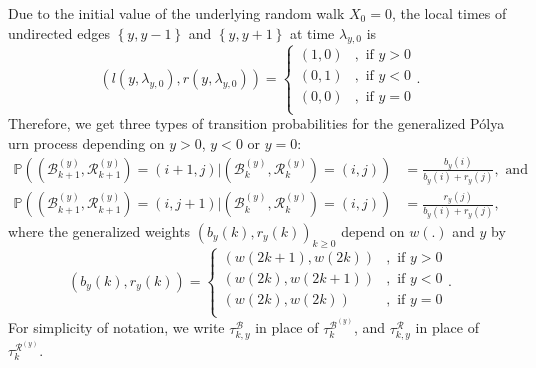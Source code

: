 \documentclass[EJP]{ejpecp} %
\begin{document}
Due to the initial value of the underlying random walk $X_0=0$, the local times of undirected edges $\left\{y,y-1\right\}$ and $\left\{y,y+1\right\}$ at time $\lambda_{y,0}$ is 
\begin{equation}\label{eq: initial condition}
	\left(l(y,\lambda_{y,0}),  r( y ,\lambda_{y,0})\right) =  \begin{cases}	
		(1, 0) &,  \text{ if }  y>0 \\
		(0, 1) &,  \text{ if }  y<0 \\  
		(0, 0) &,  \text{ if }  y=0 \\
	\end{cases} 
	.\end{equation}	
Therefore, we get three types of transition probabilities
for the generalized P\'{o}lya urn process depending on $y>0$, $y<0$ or $y=0$:
\begin{align*}\label{eq: transition prob for GPU}
	\mathbb{P} \left(\left(\mathscr{B}^{(y)}_{k+1},\mathscr{R}^{(y)}_{k+1} \right)=  (i+1,j) \vert \left(\mathscr{B}^{(y)}_{k},\mathscr{R}^{(y)}_{k}\right) =(i,j)  \right) &= \frac{b_y(i)}{b_y(i)+r_y(j)}, \mbox{ and}  \\
	\mathbb{P} \left( \left(\mathscr{B}^{(y)}_{k+1},\mathscr{R}^{(y)}_{k+1}\right)=  (i,j+1) \vert \left(\mathscr{B}^{(y)}_{k},\mathscr{R}^{(y)}_{k}\right) =(i,j)  \right) &= \frac{r_y(j)}{b_y(i)+r_y(j)},
\end{align*} 
where the generalized weights $(b_y(k),r_y(k))_{k\geq 0}$ depend on $w(.)$ and $y$ by  
\begin{equation}\label{eq: generalized weights}
	(b_y(k), r_y(k)) = \begin{cases}
		(w(2k+1), w(2k)) &,  \text{ if }  y>0 \\
		(w(2k), w(2k+1)) &,  \text{ if }  y<0 \\  
		(w(2k), w(2k)) &,  \text{ if }  y=0 \\ 
	\end{cases}.
\end{equation}
For simplicity of notation, we write $\tau_{k,y}^{\mathscr{B}}$ in place of $\tau_k^{\mathscr{B}^{(y)}}$, and $\tau_{k,y}^{\mathscr{R}}$ in place of $\tau_k^{\mathscr{R}^{(y)}}$.
\end{document}

